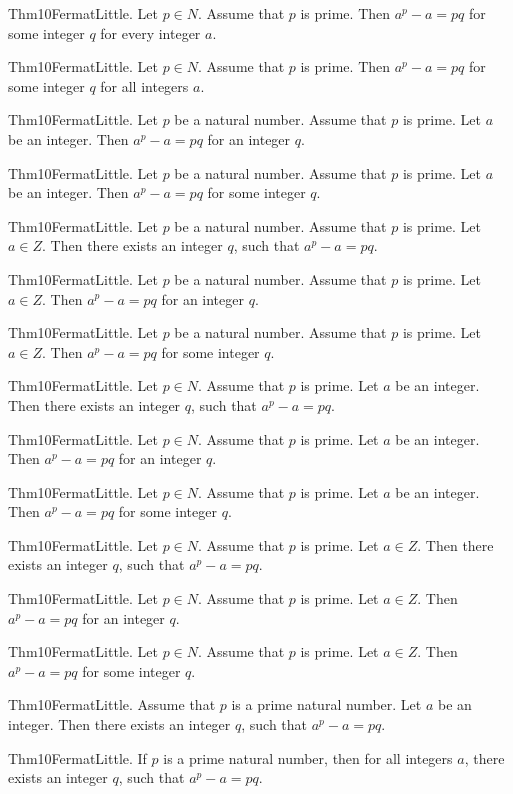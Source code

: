 \documentclass{article}
\begin{document}
Thm10FermatLittle. Let $p \in N$. Assume that $p$ is prime. Then $a ^ {p}- a = p q$ for some integer $q$ for every integer $a$.

Thm10FermatLittle. Let $p \in N$. Assume that $p$ is prime. Then $a ^ {p}- a = p q$ for some integer $q$ for all integers $a$.

Thm10FermatLittle. Let $p$ be a natural number. Assume that $p$ is prime. Let $a$ be an integer. Then $a ^ {p}- a = p q$ for an integer $q$.

Thm10FermatLittle. Let $p$ be a natural number. Assume that $p$ is prime. Let $a$ be an integer. Then $a ^ {p}- a = p q$ for some integer $q$.

Thm10FermatLittle. Let $p$ be a natural number. Assume that $p$ is prime. Let $a \in Z$. Then there exists an integer $q$, such that $a ^ {p}- a = p q$.

Thm10FermatLittle. Let $p$ be a natural number. Assume that $p$ is prime. Let $a \in Z$. Then $a ^ {p}- a = p q$ for an integer $q$.

Thm10FermatLittle. Let $p$ be a natural number. Assume that $p$ is prime. Let $a \in Z$. Then $a ^ {p}- a = p q$ for some integer $q$.

Thm10FermatLittle. Let $p \in N$. Assume that $p$ is prime. Let $a$ be an integer. Then there exists an integer $q$, such that $a ^ {p}- a = p q$.

Thm10FermatLittle. Let $p \in N$. Assume that $p$ is prime. Let $a$ be an integer. Then $a ^ {p}- a = p q$ for an integer $q$.

Thm10FermatLittle. Let $p \in N$. Assume that $p$ is prime. Let $a$ be an integer. Then $a ^ {p}- a = p q$ for some integer $q$.

Thm10FermatLittle. Let $p \in N$. Assume that $p$ is prime. Let $a \in Z$. Then there exists an integer $q$, such that $a ^ {p}- a = p q$.

Thm10FermatLittle. Let $p \in N$. Assume that $p$ is prime. Let $a \in Z$. Then $a ^ {p}- a = p q$ for an integer $q$.

Thm10FermatLittle. Let $p \in N$. Assume that $p$ is prime. Let $a \in Z$. Then $a ^ {p}- a = p q$ for some integer $q$.

Thm10FermatLittle. Assume that $p$ is a prime natural number. Let $a$ be an integer. Then there exists an integer $q$, such that $a ^ {p}- a = p q$.

Thm10FermatLittle. If $p$ is a prime natural number, then for all integers $a$, there exists an integer $q$, such that $a ^ {p}- a = p q$.
\end{document}
